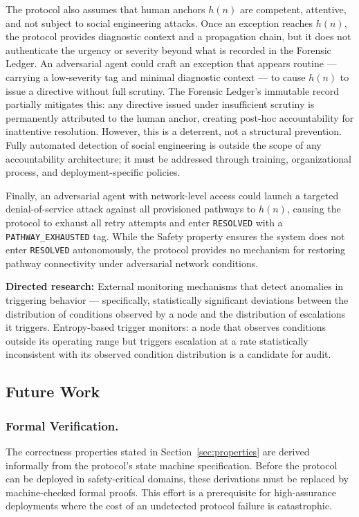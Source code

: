 The protocol also assumes that human anchors $h(n)$ are competent, attentive, and not subject to social engineering attacks. Once an exception reaches $h(n)$, the protocol provides diagnostic context and a propagation chain, but it does not authenticate the urgency or severity beyond what is recorded in the Forensic Ledger. An adversarial agent could craft an exception that appears routine --- carrying a low-severity tag and minimal diagnostic context --- to cause $h(n)$ to issue a directive without full scrutiny. The Forensic Ledger's immutable record partially mitigates this: any directive issued under insufficient scrutiny is permanently attributed to the human anchor, creating post-hoc accountability for inattentive resolution. However, this is a deterrent, not a structural prevention. Fully automated detection of social engineering is outside the scope of any accountability architecture; it must be addressed through training, organizational process, and deployment-specific policies.

Finally, an adversarial agent with network-level access could launch a targeted denial-of-service attack against all provisioned pathways to $h(n)$, causing the protocol to exhaust all retry attempts and enter \texttt{RESOLVED} with a \texttt{PATHWAY\_EXHAUSTED} tag. While the Safety property ensures the system does not enter \texttt{RESOLVED} autonomously, the protocol provides no mechanism for restoring pathway connectivity under adversarial network conditions.

\medskip\noindent\textbf{Directed research:} External monitoring mechanisms that detect anomalies in triggering behavior --- specifically, statistically significant deviations between the distribution of conditions observed by a node and the distribution of escalations it triggers. Entropy-based trigger monitors: a node that observes conditions outside its operating range but triggers escalation at a rate statistically inconsistent with its observed condition distribution is a candidate for audit.

\subsection{Future Work}

\subsubsection{Formal Verification.}
The correctness properties stated in Section~\ref{sec:properties} are derived informally from the protocol's state machine specification. Before the protocol can be deployed in safety-critical domains, these derivations must be replaced by machine-checked formal proofs. This effort is a prerequisite for high-assurance deployments where the cost of an undetected protocol failure is catastrophic.

